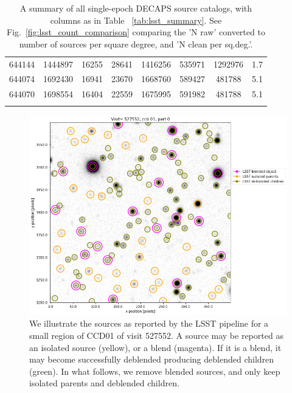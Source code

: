 \documentclass[DM,lsstdraft,toc,usenatbib]{lsstdoc}
\begin{document}
\begin{longtable}{cccccccc}
644144 & 1444897 & 16255 & 28641 & 1416256 & 535971 & 1292976 & 1.7 \\
644074 & 1692430 & 16941 & 23670 & 1668760 & 589427 & 481788 & 5.1 \\
644070 & 1698554 & 16404 & 22559 & 1675995 & 591982 & 481788 & 5.1 \\
\hline
\caption{A summary of all single-epoch DECAPS source catalogs, with columns as in  Table ~\ref{tab:lsst_summary}. See Fig.~\ref{fig:lsst_count_comparison} comparing the 'N raw' converted to number of sources per square degree, and  'N clean per sq.deg.'.  }
\label{tab:decaps_summary}
\end{longtable}


\begin{figure}
\begin{centering}
\includegraphics[width=1.0\columnwidth]{figs/visit_527552_ccd_1_blends.png}
\caption{We illustrate the sources as reported by the LSST pipeline for a small region of CCD01 of visit 527552. A source may be reported as an isolated source (yellow),  or a blend (magenta). If it is a blend, it may become successfully deblended producing deblended children (green). In what follows, we remove blended sources, and only keep isolated parents and deblended children. }
\label{fig:lsst_sources}
\end{centering}
\end{figure} 
\end{document}
